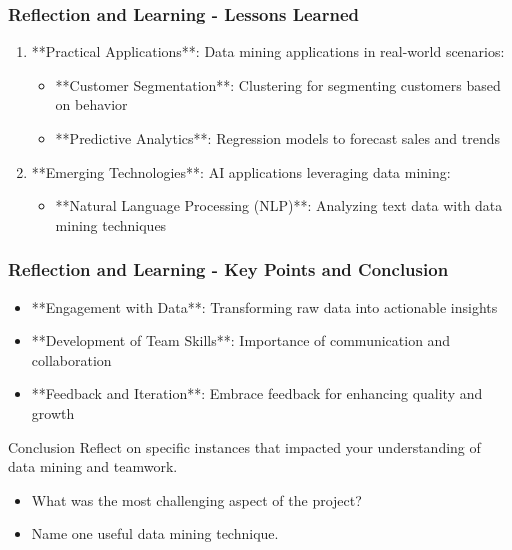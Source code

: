 \documentclass[aspectratio=169]{beamer}
\begin{document}
\begin{frame}[fragile]
    \frametitle{Reflection and Learning - Lessons Learned}
    \begin{enumerate}
        \item **Practical Applications**: Data mining applications in real-world scenarios:
        \begin{itemize}
            \item **Customer Segmentation**: Clustering for segmenting customers based on behavior
            \item **Predictive Analytics**: Regression models to forecast sales and trends
        \end{itemize}

        \item **Emerging Technologies**: AI applications leveraging data mining:
        \begin{itemize}
            \item **Natural Language Processing (NLP)**: Analyzing text data with data mining techniques
        \end{itemize}
    \end{enumerate}
\end{frame}

\begin{frame}[fragile]
    \frametitle{Reflection and Learning - Key Points and Conclusion}
    \begin{itemize}
        \item **Engagement with Data**: Transforming raw data into actionable insights
        \item **Development of Team Skills**: Importance of communication and collaboration
        \item **Feedback and Iteration**: Embrace feedback for enhancing quality and growth
    \end{itemize}
    
    \begin{block}{Conclusion}
        Reflect on specific instances that impacted your understanding of data mining and teamwork. 
        \begin{itemize}
            \item What was the most challenging aspect of the project?
            \item Name one useful data mining technique.
        \end{itemize}
    \end{block}
\end{frame}
\end{document}
